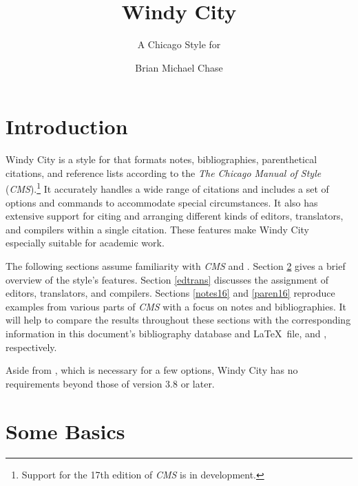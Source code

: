 \documentclass[11pt,letterpaper,oneside]{article}
\begin{document}
\title{Windy City}
\subtitle{A Chicago Style for \biblatex}
\author{Brian Michael Chase}
\maketitle
\tableofcontents{}
\newpage

\section{Introduction}
\label{intro}


Windy City is a style for \biblatex that formats notes,
bibliographies, parenthetical citations, and reference lists according
to the \textit{The Chicago Manual of Style}
(\textit{CMS}).\footnote{\cite{chicago2010} Support for the 17th
edition of \textit{CMS} is in development.} It accurately handles a
wide range of citations and includes a set of options and commands to
accommodate special circumstances. It also has extensive support for
citing and arranging different kinds of editors, translators, and
compilers within a single citation. These features make Windy City
especially suitable for academic work.

The following sections assume familiarity with \textit{CMS} and
\biblatex. Section \ref{basics} gives a brief overview of the style's
features. Section \ref{edtrans} discusses the assignment of editors,
translators, and compilers. Sections \ref{notes16} and \ref{paren16}
reproduce examples from various parts of \textit{CMS} with a focus on
notes and bibliographies. It will help to compare the results
throughout these sections with the corresponding information in this
document's bibliography database and \LaTeX\ file,
 and , respectively.

Aside from \biber, which is necessary for a few options, Windy City
has no requirements beyond those of \biblatex version 3.8 or later.

\section{Some Basics}
\label{basics}
\end{document}
